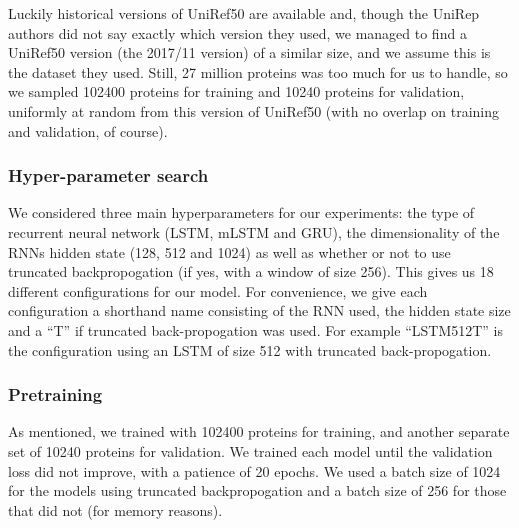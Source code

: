 \documentclass[a4paper,12pt]{article}
\begin{document}
Luckily historical versions of UniRef50 are available and, though the UniRep authors did not say exactly which version they used, we managed to find a UniRef50 version (the 2017/11 version) of a similar size, and we assume this is the dataset they used. Still, 27 million proteins was too much for us to handle, so we sampled 102400 proteins for training and 10240 proteins for validation, uniformly at random from this version of UniRef50 (with no overlap on training and validation, of course).

\subsubsection{Hyper-parameter search}\label{reproduction_parameters}
\label{section:hyperparam}
We considered three main hyperparameters for our experiments: the type of recurrent neural network (LSTM, mLSTM and GRU), the dimensionality of the RNNs hidden state (128, 512 and 1024) as well as whether or not to use truncated backpropogation (if yes, with a window of size 256). This gives us 18 different configurations for our model. For convenience, we give each configuration a shorthand name consisting of the RNN used, the hidden state size and a ``T'' if truncated back-propogation was used. For example ``LSTM512T'' is the configuration using an LSTM of size 512 with truncated back-propogation.

\subsubsection{Pretraining}\label{reproduction_pretraining}
\label{section:pretraining}
As mentioned, we trained with 102400 proteins for training, and another separate set of 10240 proteins for validation. We trained each model until the validation loss did not improve, with a patience of 20 epochs. We used a batch size of 1024 for the models using truncated backpropogation and a batch size of 256 for those that did not (for memory reasons). 


\end{document}
